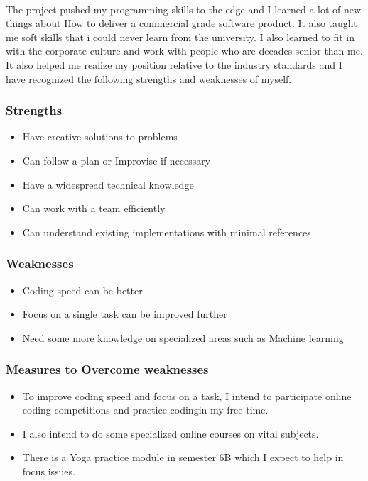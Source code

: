 \paragraph{}
The project pushed my programming skills to the edge and I learned a lot of new things about How to deliver a commercial grade software product. It also taught me soft skills that i could never learn from the university. I also learned to fit in with the corporate culture and work with people who are decades senior than me. It also helped me realize my position relative to the industry standards and I have recognized the following strengths and weaknesses of myself.

\subsubsection*{Strengths}
\begin{itemize}
    \item Have creative solutions to problems
    \item Can follow a plan or Improvise if necessary
    \item Have a widespread technical knowledge
    \item Can work with a team efficiently
    \item Can understand existing implementations with minimal references
\end{itemize}

\subsubsection*{Weaknesses}
\begin{itemize}
    \item Coding speed can be better
    \item Focus on a single task can be improved further
    \item Need some more knowledge on specialized areas such as Machine learning
\end{itemize}

\subsubsection*{Measures to Overcome weaknesses}
\begin{itemize}
    \item To improve coding speed and focus on a task, I intend to participate online coding competitions and practice codingin my free time.
    \item I also intend to do some specialized online courses on vital subjects.
    \item There is a Yoga practice module in semester 6B which I expect to help in focus issues.
\end{itemize}

